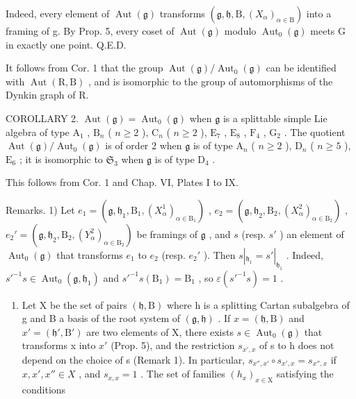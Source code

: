 Indeed, every element of \(\operatorname{Aut}(\mathfrak{g})\) transforms \((\mathfrak{g},\mathfrak{h},\mathrm{B},(X_{\alpha})_{\alpha\in\mathrm{B}})\) into a framing of g. By Prop. 5, every coset of \(\operatorname{Aut}(\mathfrak{g})\) modulo \(\operatorname{Aut}_{0}(\mathfrak{g})\) meets G in exactly one point. Q.E.D.

It follows from Cor. 1 that the group \(\operatorname{Aut}(\mathfrak{g})/\operatorname{Aut}_{0}(\mathfrak{g})\) can be identified with \(\operatorname{Aut}(\mathrm{R},\mathrm{B})\) , and is isomorphic to the group of automorphisms of the Dynkin graph of R.

COROLLARY 2. \(\operatorname{Aut}(\mathfrak{g}) = \operatorname{Aut}_0(\mathfrak{g})\) when \(\mathfrak{g}\) is a splittable simple Lie algebra of type \(\mathrm{A}_1\) , \(\mathrm{B}_n\) ( \(n \geq 2\) ), \(\mathrm{C}_n\) ( \(n \geq 2\) ), \(\mathrm{E}_7\) , \(\mathrm{E}_8\) , \(\mathrm{F}_4\) , \(\mathrm{G}_2\) . The quotient \(\operatorname{Aut}(\mathfrak{g}) / \operatorname{Aut}_0(\mathfrak{g})\) is of order 2 when \(\mathfrak{g}\) is of type \(\mathrm{A}_n\) ( \(n \geq 2\) ), \(\mathrm{D}_n\) ( \(n \geq 5\) ), \(\mathrm{E}_6\) ; it is isomorphic to \(\mathfrak{S}_3\) when \(\mathfrak{g}\) is of type \(\mathrm{D}_4\) .

This follows from Cor. 1 and Chap. VI, Plates I to IX.

Remarks. 1) Let \(e_1 = (\mathfrak{g}, \mathfrak{h}_1, \mathrm{B}_1, (X_\alpha^1)_{\alpha \in \mathrm{B}_1})\) , \(e_2 = (\mathfrak{g}, \mathfrak{h}_2, \mathrm{B}_2, (X_\alpha^2)_{\alpha \in \mathrm{B}_2})\) , \(e_2' = (\mathfrak{g}, \mathfrak{h}_2, \mathrm{B}_2, (Y_\alpha^2)_{\alpha \in \mathrm{B}_2})\) be framings of \(\mathfrak{g}\) , and \(s\) (resp. \(s'\) ) an element of \(\operatorname{Aut}_0(\mathfrak{g})\) that transforms \(e_1\) to \(e_2\) (resp. \(e_2'\) ). Then \(s|_{\mathfrak{h}_1} = s'|_{\mathfrak{h}_1}\) . Indeed, \(s'^{-1}s \in \operatorname{Aut}_0(\mathfrak{g}, \mathfrak{h}_1)\) and \(s'^{-1}s(\mathrm{B}_1) = \mathrm{B}_1\) , so \(\varepsilon(s'^{-1}s) = 1\) .

\begin{enumerate}
\def\labelenumi{\arabic{enumi})}
\setcounter{enumi}{1}
\tightlist
\item
  Let X be the set of pairs \((\mathfrak{h},\mathrm{B})\) where h is a splitting Cartan subalgebra of g and B a basis of the root system of \((\mathfrak{g},\mathfrak{h})\) . If \(x=(\mathfrak{h},\mathrm{B})\) and \(x'=(\mathfrak{h}',\mathrm{B}')\) are two elements of X, there exists \(s\in\operatorname{Aut}_{0}(\mathfrak{g})\) that transforms x into \(x'\) (Prop. 5), and the restriction \(s_{x',x}\) of s to h does not depend on the choice of s (Remark 1). In particular, \(s_{x'',x'}\circ s_{x',x}=s_{x'',x}\) if \(x,x',x''\in X\) , and \(s_{x,x}=1\) . The set of families \((h_{x})_{x\in\mathrm{X}}\) satisfying the conditions
\end{enumerate}

